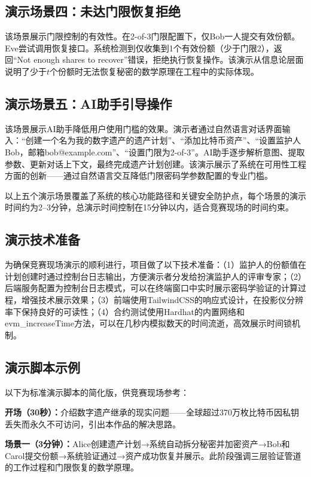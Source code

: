 \documentclass[UTF8,a4paper,zihao=-4,openany]{ctexrep}
\begin{document}
\subsection{演示场景四：未达门限恢复拒绝}

该场景展示门限控制的有效性。在2-of-3门限配置下，仅Bob一人提交有效份额。Eve尝试调用恢复接口。系统检测到仅收集到1个有效份额（少于门限2），返回“Not enough shares to recover”错误，拒绝执行恢复操作。该演示从信息论层面说明了少于$t$个份额时无法恢复秘密的数学原理在工程中的实际体现。

\subsection{演示场景五：AI助手引导操作}

该场景展示AI助手降低用户使用门槛的效果。演示者通过自然语言对话界面输入：“创建一个名为我的数字遗产的遗产计划”、“添加比特币资产”、“设置监护人Bob，邮箱bob@example.com”、“设置门限为2-of-3”。AI助手逐步解析意图、提取参数、更新对话上下文，最终完成遗产计划创建。该演示展示了系统在可用性工程方面的创新——通过自然语言交互降低门限密码学参数配置的专业门槛。

以上五个演示场景覆盖了系统的核心功能路径和关键安全防护点，每个场景的演示时间约为2--3分钟，总演示时间控制在15分钟以内，适合竞赛现场的时间约束。

\subsection{演示技术准备}

为确保竞赛现场演示的顺利进行，项目做了以下技术准备：（1）监护人的份额值在计划创建时通过控制台日志输出，方便演示者分发给扮演监护人的评审专家；（2）后端服务配置为控制台日志模式，可以在终端窗口中实时展示密码学验证的计算过程，增强技术展示效果；（3）前端使用TailwindCSS的响应式设计，在投影仪分辨率下保持良好的可读性；（4）合约测试使用Hardhat的内置网络和evm\_increaseTime方法，可以在几秒内模拟数天的时间流逝，高效展示时间锁机制。

\subsection{演示脚本示例}

以下为标准演示脚本的简化版，供竞赛现场参考：

\textbf{开场（30秒）：}介绍数字遗产继承的现实问题——全球超过370万枚比特币因私钥丢失而永久不可访问，引出本作品的解决思路。

\textbf{场景一（3分钟）：}Alice创建遗产计划→系统自动拆分秘密并加密资产→Bob和Carol提交份额→系统验证通过→资产成功恢复并展示。此阶段强调三层验证管道的工作过程和门限恢复的数学原理。
\end{document}
